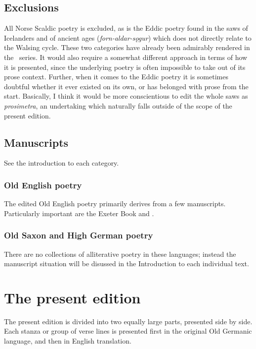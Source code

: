   \subsection{Exclusions}
    All Norse Scaldic poetry is excluded, as is the Eddic poetry found in the saws of Icelanders and of ancient ages (\emph{forn-aldar-sǫgur}) which does not directly relate to the Walsing cycle.  These two categories have already been admirably rendered in the \Skp\ series.  It would also require a somewhat different approach in terms of how it is presented, since the underlying poetry is often impossible to take out of its prose context.  Further, when it comes to the Eddic poetry it is sometimes doubtful whether it ever existed on its own, or has belonged with prose from the start.  Basically, I think it would be more conscientious to edit the whole saws as \emph{prosimetra}, an undertaking which naturally falls outside of the scope of the present edition.

  \subsection{Manuscripts}

    See the introduction to each category.

    \subsubsection{Old English poetry}

    The edited Old English poetry primarily derives from a few manuscripts.  Particularly important are the Exeter Book and \Lacnunga.

    \subsubsection{Old Saxon and High German poetry}

    There are no collections of alliterative poetry in these languages; instead the manuscript situation will be disussed in the Introduction to each individual text.


\section{The present edition}

  The present edition is divided into two equally large parts, presented side by side.  Each stanza or group of verse lines is presented first in the original Old Germanic language, and then in English translation.

